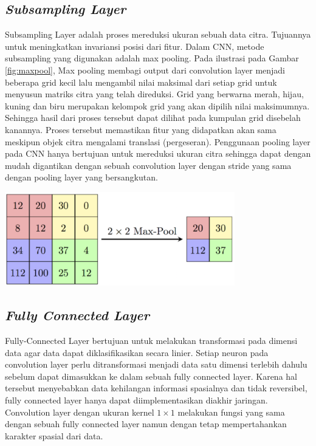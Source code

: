 \subsection{\textit{Subsampling Layer}}
Subsampling Layer adalah proses mereduksi ukuran sebuah data citra. Tujuannya untuk meningkatkan invariansi posisi dari fitur.
Dalam CNN, metode subsampling yang digunakan adalah max pooling. Pada ilustrasi pada Gambar \ref{fig:maxpool}, Max pooling membagi output
dari convolution layer menjadi beberapa grid kecil lalu mengambil
nilai maksimal dari setiap grid untuk menyusun matriks citra yang
telah direduksi. Grid yang berwarna merah, hijau, kuning dan biru merupakan kelompok grid yang akan dipilih nilai maksimumnya.
Sehingga hasil dari proses tersebut dapat dilihat pada kumpulan
grid disebelah kanannya. Proses tersebut memastikan fitur yang
didapatkan akan sama meskipun objek citra mengalami translasi
(pergeseran). Penggunaan pooling layer pada CNN hanya bertujuan untuk mereduksi ukuran citra sehingga dapat dengan mudah
digantikan dengan sebuah convolution layer dengan stride yang sama dengan pooling layer yang bersangkutan.\citep{Wayan_Suartika_undated-rv}
\begin{center}
	\includegraphics[width=0.75\textwidth]{gambar/ilusMaxpool.png}
	\citep{Wayan_Suartika_undated-rv}
	\label{fig:maxpool}
\end{center}

\subsection{\textit{Fully Connected Layer}}
Fully-Connected Layer bertujuan untuk melakukan transformasi pada dimensi data agar data dapat diklasifikasikan secara linier. Setiap neuron pada convolution layer perlu ditransformasi menjadi data satu dimensi terlebih dahulu sebelum dapat dimasukkan
ke dalam sebuah fully connected layer. Karena hal tersebut menyebabkan data kehilangan informasi spasialnya dan tidak reversibel,
fully connected layer hanya dapat diimplementasikan diakhir jaringan. Convolution layer dengan ukuran kernel $1 \times 1$ melakukan fungsi
yang sama dengan sebuah fully connected layer namun dengan tetap
mempertahankan karakter spasial dari data.\citep{Wayan_Suartika_undated-rv}

